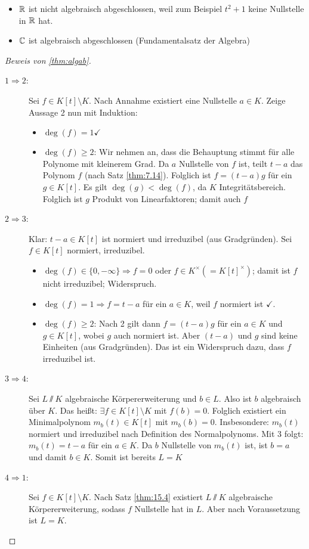 \documentclass[12pt,a4paper]{scrartcl}
\begin{document}
\begin{bsp}
	\leavevmode
	\begin{itemize}
		\item $\mathbb R$ ist nicht algebraisch abgeschlossen, weil zum Beispiel $t^2+1$ keine Nullstelle in $\mathbb R$ hat.
		\item $\mathbb C$ ist algebraisch abgeschlossen (Fundamentalsatz der Algebra)
	\end{itemize}
\end{bsp}

\begin{proof}[Beweis von \ref{thm:algab}]
	\leavevmode
	\begin{description}
		\item[$1\Rightarrow2$:] Sei $f \in K[t]\setminus K$. Nach Annahme existiert eine Nullstelle $a \in K$. Zeige Aussage 2 nun mit Induktion:
		\begin{itemize}
			\item $\deg(f) = 1 \checkmark$
			\item $\deg(f)\geq 2$: Wir nehmen an, dass die Behauptung stimmt für alle Polynome mit kleinerem Grad. Da $a$ Nullstelle von $f$ ist, teilt $t-a$ das Polynom $f$ (nach Satz \ref{thm:7.14}).
			Folglich ist $f = (t-a)g$ für ein $g\in K[t]$. Es gilt $\deg(g)<\deg(f)$, da $K$ Integritätsbereich. Folglich ist $g$ Produkt von Linearfaktoren; damit auch $f$
		\end{itemize}
		\item[$2\Rightarrow 3$:]  Klar: $t-a\in K[t]$ ist normiert und irreduzibel (aus Gradgründen). Sei $f\in K[t]$ normiert, irreduzibel.
		\begin{itemize}
			\item $\deg(f) \in\{0,-\infty\}\Rightarrow f = 0$ oder $f\in K^{\times} (= K[t]^{\times})$; damit ist $f$ nicht irreduzibel; Widerspruch.
			\item $\deg(f) = 1\Rightarrow f = t-a$ für ein $a\in K$, weil $f$ normiert ist $\checkmark$.
			\item $\deg (f)\geq 2$: Nach 2 gilt dann $f = (t-a)g$ für ein $a\in K$ und $g\in K[t]$, wobei $g$ auch normiert ist. Aber $(t-a)$ und $g$ sind keine Einheiten (aus Gradgründen). Das ist ein Widerspruch dazu, dass $f$ irreduzibel ist.
		\end{itemize}
		\item[$3\Rightarrow 4$:] Sei $L\sslash K$ algebraische Körpererweiterung und $b\in L$. Also ist $b$ algebraisch über $K$. Das heißt: $\exists f\in K[t]\setminus K$ mit $f(b) = 0$. Folglich existiert ein Minimalpolynom $m_b(t)\in K[t]$ mit $m_b(b)= 0$. Insbesondere: $m_b(t)$ normiert und irreduzibel nach Definition des Normalpolynoms. Mit 3 folgt:  $m_b(t) = t-a$ für ein $a\in K$. Da $b$ Nullstelle von $m_b(t)$ ist, ist $b = a$ und damit $b\in K$. Somit ist bereits $L = K$
		\item[$4\Rightarrow1$:] Sei $f\in K[t]\setminus K$. Nach Satz \ref{thm:15.4} existiert $L\sslash K$ algebraische Körpererweiterung, sodass $f$ Nullstelle hat in $L$. Aber nach Voraussetzung ist $L = K$. 
	\end{description}
\end{proof}
	
\end{document}

